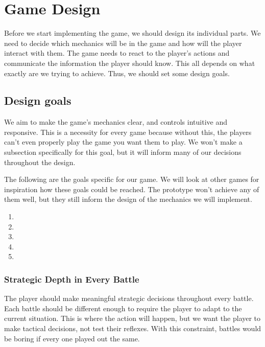 \chapter{Game Design}

Before we start implementing the game, we should design its individual parts.
We need to decide which mechanics will be in the game and how will the player interact with them.
The game needs to react to the player's actions and communicate the information the player should know.
This all depends on what exactly are we trying to achieve.
Thus, we should set some design goals.

\section{Design goals}

We aim to make the game's mechanics clear, and controls intuitive and responsive.
This is a necessity for every game because without this, the players can't even properly play the game you want them to play.
We won't make a subsection specifically for this goal, but it will inform many of our decisions throughout the design.

The following are the goals specific for our game.
We will look at other games for inspiration how these goals could be reached.
The prototype won't achieve any of them well, but they still inform the design of the mechanics we will implement.

\begin{enumerate}
    \item {}
    \item {}
    \item {}
    \item {}
    \item {}
\end{enumerate}

\subsection{Strategic Depth in Every Battle} \label{sec:goal-depth-battle}

The player should make meaningful strategic decisions throughout every battle.
Each battle should be different enough to require the player to adapt to the current situation.
This is where the action will happen, but we want the player to make tactical decisions, not test their reflexes.
With this constraint, battles would be boring if every one played out the same.

